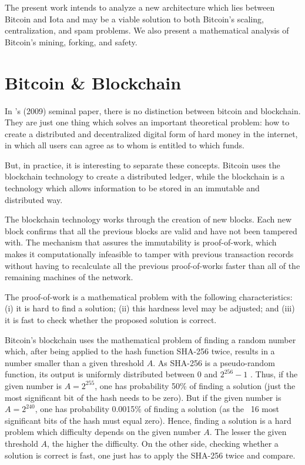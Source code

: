 The present work intends to analyze a new architecture which lies between Bitcoin and Iota and may be a viable solution to both Bitcoin's scaling, centralization, and spam problems. We also present a mathematical analysis of Bitcoin's mining, forking, and safety.


\chapter{Bitcoin \& Blockchain}

In \citeauthor{nakamoto2008bitcoin}'s (2009) seminal paper, there is no distinction between bitcoin and blockchain. They are just one thing which solves an important theoretical problem: how to create a distributed and decentralized digital form of hard money in the internet, in which all users can agree as to whom is entitled to which funds.

But, in practice, it is interesting to separate these concepts. Bitcoin uses the blockchain technology to create a distributed ledger, while the blockchain is a technology which allows information to be stored in an immutable and distributed way.

The blockchain technology works through the creation of new blocks. Each new block confirms that all the previous blocks are valid and have not been tampered with. The mechanism that assures the immutability is proof-of-work, which makes it computationally infeasible to tamper with previous transaction records without having to recalculate all the previous proof-of-works faster than all of the remaining machines of the network.

The proof-of-work is a mathematical problem with the following characteristics: (i) it is hard to find a solution; (ii) this hardness level may be adjusted; and (iii) it is fast to check whether the proposed solution is correct.

Bitcoin's blockchain uses the mathematical problem of finding a random number which, after being applied to the hash function SHA-256 twice, results in a number smaller than a given threshold $A$. As SHA-256 is a pseudo-random function, its output is uniformly distributed between 0 and $2^{256}-1$ \citep{gilbert2003security}. Thus, if the given number is $A = 2^{255}$, one has probability 50\% of finding a solution (just the most significant bit of the hash needs to be zero). But if the given number is $A = 2^{240}$, one has probability 0.0015\% of finding a solution (as the ~16 most significant bits of the hash must equal zero). Hence, finding a solution is a hard problem which difficulty depends on the given number $A$. The lesser the given threshold $A$, the higher the difficulty. On the other side, checking whether a solution is correct is fast, one just has to apply the SHA-256 twice and compare.

